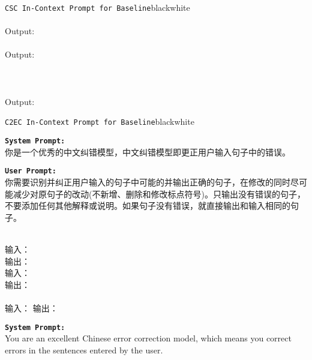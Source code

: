 \begin{figure*}[p!]
\begin{promptbox}{\texttt{CSC In-Context Prompt for Baseline}}{black}{white}
        \return\\
        \phantom{Output:} \return\\
        Output: \return\return\\
        \phantom{Output:} \return\\
        Output: \return\return\\
        \return\return\\\\
        \phantom{Output:} \return\\
        Output:

    \end{promptbox}
    \begin{promptbox}{\texttt{C2EC In-Context Prompt for Baseline}}{black}{white}
        \footnotesize{
            \textbf{\texttt{System Prompt:}}\\
            你是一个优秀的中文纠错模型，中文纠错模型即更正用户输入句子中的错误。\return

            \textbf{\texttt{User Prompt:}}\\
            你需要识别并纠正用户输入的句子中可能的并输出正确的句子，在修改的同时尽可能减少对原句子的改动(不新增、删除和修改标点符号)。只输出没有错误的句子，不要添加任何其他解释或说明。如果句子没有错误，就直接输出和输入相同的句子。\return\return

            \return\\
            输入：\return\\
            输出：\return\return\\
            输入：\return\\
            输出：\return\return\\
            \return\return\\

            输入：\return
            输出：
        }
        \tcblower
        \scriptsize
        \textbf{\texttt{System Prompt:}}\\
        You are an excellent Chinese error correction model, which means you correct errors in the sentences entered by the user.\return


\end{promptbox}
\end{figure*}
